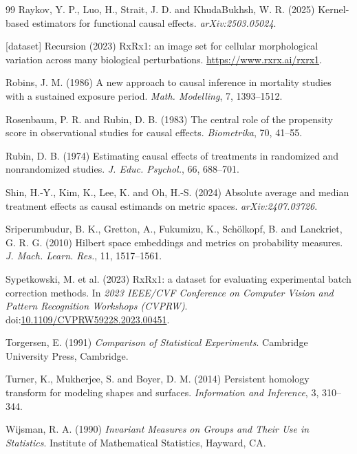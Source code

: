 \documentclass[11pt]{article}
\theoremstyle{plain}
\theoremstyle{definition}
\numberwithin{equation}{section}
\newcommand{\1}{\mathbf 1}
\begin{document}
\begin{thebibliography}{99}
Raykov, Y. P., Luo, H., Strait, J. D. and KhudaBukhsh, W. R. (2025) Kernel-based estimators for functional causal effects. \emph{arXiv:2503.05024}.

[dataset] Recursion (2023) RxRx1: an image set for cellular morphological variation across many biological perturbations. \url{https://www.rxrx.ai/rxrx1}.

Robins, J. M. (1986) A new approach to causal inference in mortality studies with a sustained exposure period. \emph{Math. Modelling}, 7, 1393--1512.

Rosenbaum, P. R. and Rubin, D. B. (1983) The central role of the propensity score in observational studies for causal effects. \emph{Biometrika}, 70, 41--55.

Rubin, D. B. (1974) Estimating causal effects of treatments in randomized and nonrandomized studies. \emph{J. Educ. Psychol.}, 66, 688--701.

Shin, H.-Y., Kim, K., Lee, K. and Oh, H.-S. (2024) Absolute average and median treatment effects as causal estimands on metric spaces. \emph{arXiv:2407.03726}.

Sriperumbudur, B. K., Gretton, A., Fukumizu, K., Sch\"olkopf, B. and Lanckriet, G. R. G. (2010) Hilbert space embeddings and metrics on probability measures. \emph{J. Mach. Learn. Res.}, 11, 1517--1561.

Sypetkowski, M. et al. (2023) RxRx1: a dataset for evaluating experimental
batch correction methods. In \emph{2023 IEEE/CVF Conference on Computer
Vision and Pattern Recognition Workshops (CVPRW)}.
doi:\href{https://doi.org/10.1109/CVPRW59228.2023.00451}{10.1109/CVPRW59228.2023.00451}.

Torgersen, E. (1991) \emph{Comparison of Statistical Experiments}. Cambridge University Press, Cambridge.

Turner, K., Mukherjee, S. and Boyer, D. M. (2014) Persistent homology transform for modeling shapes and surfaces. \emph{Information and Inference}, 3, 310--344.

Wijsman, R. A. (1990) \emph{Invariant Measures on Groups and Their Use in Statistics}. Institute of Mathematical Statistics, Hayward, CA.

\end{thebibliography}
\end{document}
